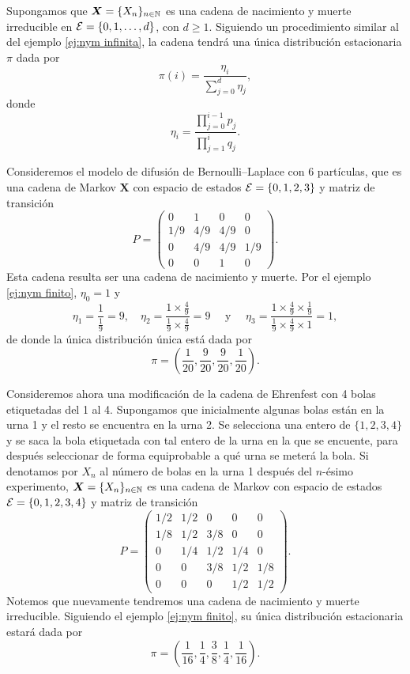 \begin{example} \label{ej:nym finito}
    Supongamos que $\bm X = \{X_n\}_{n \in \mathbb{N}}$ es una cadena de nacimiento y muerte irreducible en $\mathcal{E} = \{0, 1, \ldots, d\}$, con $d \geq 1$. Siguiendo un procedimiento similar al del ejemplo \ref{ej:nym infinita}, la cadena tendrá una única distribución estacionaria $\pi$ dada por 
    \[
        \pi(i) = \frac{\eta_i}{\sum_{j = 0}^d \eta_j},
    \] donde 
    \[
        \eta_i = \frac{\prod_{j = 0}^{i-1} p_j}{\prod_{j = 1}^i q_j}.    
    \]
\end{example}

\begin{example}
    Consideremos el modelo de difusión de Bernoulli--Laplace con $6$ partículas, que es una cadena de Markov $\bm X$ con espacio de estados $\mathcal{E} = \{0,1,2,3\}$ y matriz de transición
    \[
        P = \begin{pmatrix}
            0 & 1 & 0 & 0 \\
            1/9 & 4/9 & 4/9 & 0 \\
            0 & 4/9 & 4/9 & 1/9 \\
            0 & 0 & 1 & 0
        \end{pmatrix}.
    \]
    Esta cadena resulta ser una cadena de nacimiento y muerte. Por el ejemplo \ref{ej:nym finito}, $\eta_0 = 1$ y
    \[
        \eta_1 = \frac{1}{\frac 1 9} = 9, \quad \eta_2 = \frac{1 \times \frac 4 9}{\frac 1 9 \times \frac 4 9} = 9 \quad \text{ y } \quad \eta_3 = \frac{1 \times \frac 4 9 \times \frac 1 9}{\frac 1 9 \times \frac 4 9 \times 1} = 1,
    \] de donde la única distribución única está dada por 
    \[
        \pi = \left( \frac 1 {20}, \frac 9 {20}, \frac 9 {20}, \frac 1 {20} \right).
    \]
\end{example}

\begin{example}
    Consideremos ahora una modificación de la cadena de Ehrenfest con 4 bolas etiquetadas del 1 al 4. Supongamos que inicialmente algunas bolas están en la urna 1 y el resto se encuentra en la urna 2. Se selecciona una entero de $\{1, 2, 3, 4\}$ y se saca la bola etiquetada con tal entero de la urna en la que se encuente, para después seleccionar de forma equiprobable a qué urna se meterá la bola. Si denotamos por $X_n$ al número de bolas en la urna 1 después del $n$-ésimo experimento, $\bm X = \{X_n\}_{n \in \mathbb{N}}$ es una cadena de Markov con espacio de estados $\mathcal{E} = \{0,1, 2, 3, 4\}$ y matriz de transición
    \[
        P = \begin{pmatrix}
            1/2 & 1/2 & 0 & 0 & 0 \\
            1/8 & 1/2 & 3/8 & 0 & 0 \\
            0 & 1/4 & 1/2 & 1/4 & 0 \\
            0 & 0 & 3/8 & 1/2 & 1/8 \\
            0 & 0 & 0 & 1/2 & 1/2
        \end{pmatrix}.
    \] Notemos que nuevamente tendremos una cadena de nacimiento y muerte irreducible. Siguiendo el ejemplo \ref{ej:nym finito}, su única distribución estacionaria estará dada por
    \[
        \pi = \left( \frac 1{16}, \frac 1 4, \frac 3 8, \frac 1 4, \frac 1{16} \right).
    \]
\end{example}


